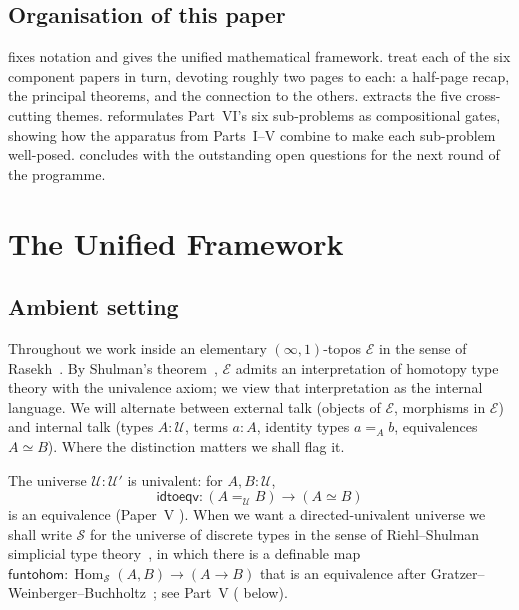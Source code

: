 \documentclass[12pt]{article}
\theoremstyle{definition}
\theoremstyle{remark}
\newcommand{\Type}{\mathcal{U}}
\newcommand{\Spc}{\mathcal{S}}
\newcommand{\idtoeqv}{\mathsf{idtoeqv}}
\DeclareMathOperator{\Hom}{Hom}
\newcommand{\funtohom}{\mathsf{funtohom}}
\begin{document}
\subsection{Organisation of this paper}

 fixes notation and gives the unified mathematical
framework. 
treat each of the six component papers in turn, devoting roughly two
pages to each:
a half-page recap, the principal theorems, and the connection to the
others.  extracts the five cross-cutting themes.
 reformulates Part~VI's six sub-problems as
compositional gates, showing how the apparatus from Parts~I--V combine
to make each sub-problem well-posed.  concludes with the
outstanding open questions for the next round of the programme.

\section{The Unified Framework}\label{sec:framework}

\subsection{Ambient setting}

Throughout we work inside an elementary $(\infty,1)$-topos $\mathcal{E}$
in the sense of Rasekh~\cite{Rasekh2018}. By Shulman's
theorem~\cite{Shulman2019}, $\mathcal{E}$ admits an interpretation of
homotopy type theory with the univalence axiom; we view that
interpretation as the internal language. We will alternate between
external talk (objects of $\mathcal{E}$, morphisms in $\mathcal{E}$) and
internal talk (types $A : \Type$, terms $a : A$, identity types
$a =_A b$, equivalences $A \simeq B$). Where the distinction matters we
shall flag it.

The universe $\Type : \Type'$ is univalent: for $A,B : \Type$,
\begin{equation}
\idtoeqv : (A =_{\Type} B) \to (A \simeq B)
\end{equation}
is an equivalence (Paper~V \cite{paperV}). When we want a directed-univalent
universe we shall write $\Spc$ for the universe of discrete types in the
sense of Riehl--Shulman simplicial type theory~\cite{RiehlShulman}, in
which there is a definable map $\funtohom : \Hom_{\Spc}(A,B) \to (A \to B)$
that is an equivalence after Gratzer--Weinberger--Buchholtz~\cite{GWB2024};
see Part~V ( below).
\end{document}
